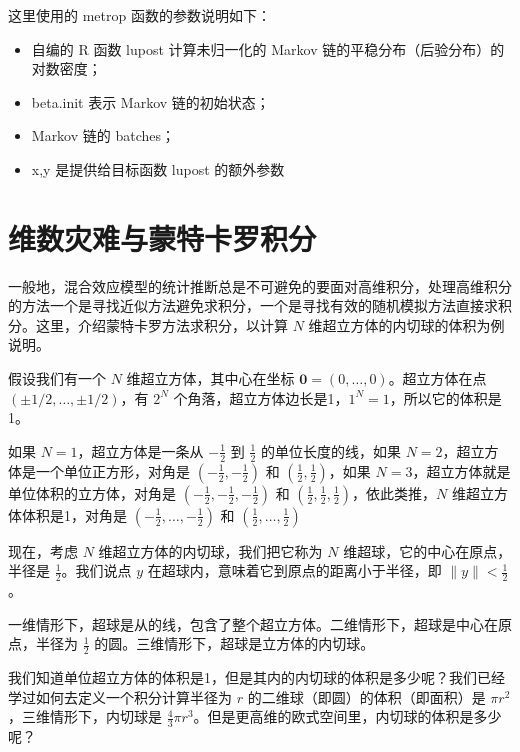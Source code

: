\documentclass[12pt,a4paper,UTF8,twoside]{book}
\providecommand{\tightlist}{%
  \setlength{\itemsep}{0pt}\setlength{\parskip}{0pt}}
\theoremstyle{definition}
\theoremstyle{definition}
\theoremstyle{definition}
\theoremstyle{remark}
\begin{document}
这里使用的 metrop 函数的参数说明如下：

\begin{itemize}
\tightlist
\item
  自编的 R 函数 lupost 计算未归一化的 Markov
  链的平稳分布（后验分布）的对数密度；
\item
  beta.init 表示 Markov 链的初始状态；
\item
  Markov 链的 batches；
\item
  x,y 是提供给目标函数 lupost 的额外参数
\end{itemize}

\hypertarget{Curse-of-Dimensionality}{%
\section{维数灾难与蒙特卡罗积分}\label{Curse-of-Dimensionality}}

一般地，混合效应模型的统计推断总是不可避免的要面对高维积分，处理高维积分的方法一个是寻找近似方法避免求积分，一个是寻找有效的随机模拟方法直接求积分。这里，介绍蒙特卡罗方法求积分，以计算
\(N\) 维超立方体的内切球的体积为例说明。

假设我们有一个 \(N\) 维超立方体，其中心在坐标
\(\mathbf{0} = (0,\ldots,0)\)。超立方体在点
\((\pm 1/2,\ldots,\pm 1/2)\)，有 \(2^{N}\)
个角落，超立方体边长是1，\(1^{N}=1\)，所以它的体积是1。

如果 \(N=1\)，超立方体是一条从 \(-\frac{1}{2}\) 到 \(\frac{1}{2}\)
的单位长度的线，如果 \(N=2\)，超立方体是一个单位正方形，对角是
\(\left( -\frac{1}{2}, -\frac{1}{2} \right)\) 和
\(\left( \frac{1}{2}, \frac{1}{2} \right)\)，如果
\(N=3\)，超立方体就是单位体积的立方体，对角是
\(\left( -\frac{1}{2}, -\frac{1}{2}, -\frac{1}{2} \right)\) 和
\(\left( \frac{1}{2}, \frac{1}{2}, \frac{1}{2} \right)\)，依此类推，\(N\)
维超立方体体积是1，对角是
\(\left( -\frac{1}{2}, \ldots, -\frac{1}{2} \right)\) 和
\(\left( \frac{1}{2}, \ldots, \frac{1}{2} \right)\)

现在，考虑 \(N\) 维超立方体的内切球，我们把它称为 \(N\)
维超球，它的中心在原点，半径是 \(\frac{1}{2}\)。我们说点 \(y\)
在超球内，意味着它到原点的距离小于半径，即 \(\| y \| < \frac{1}{2}\)。

一维情形下，超球是从的线，包含了整个超立方体。二维情形下，超球是中心在原点，半径为
\(\frac{1}{2}\) 的圆。三维情形下，超球是立方体的内切球。

我们知道单位超立方体的体积是1，但是其内的内切球的体积是多少呢？我们已经学过如何去定义一个积分计算半径为
\(r\) 的二维球（即圆）的体积（即面积）是
\(\pi r^2\)，三维情形下，内切球是
\(\frac{4}{3}\pi r^3\)。但是更高维的欧式空间里，内切球的体积是多少呢？
\end{document}
